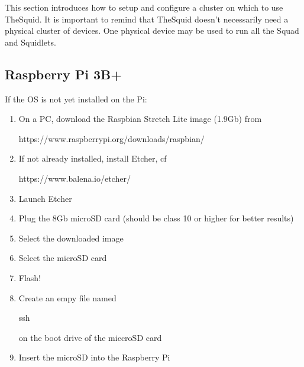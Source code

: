 This section introduces how to setup and configure a cluster on which to use TheSquid. It is important to remind that TheSquid doesn't necessarily need a physical cluster of devices. One physical device may be used to run all the Squad and Squidlets.\\

\subsection{Raspberry Pi 3B+}

If the OS is not yet installed on the Pi: 
\begin{enumerate}
\item On a PC, download the Raspbian Stretch Lite image (1.9Gb) from \begin{ttfamily}https://www.raspberrypi.org/downloads/raspbian/\end{ttfamily}
\item If not already installed, install Etcher, cf \begin{ttfamily}https://www.balena.io/etcher/\end{ttfamily}
\item Launch Etcher
\item Plug the 8Gb microSD card (should be class 10 or higher for better results)
\item Select the downloaded image
\item Select the microSD card
\item Flash!
\item Create an empy file named \begin{ttfamily}ssh\end{ttfamily} on the boot drive of the miccroSD card
\item Insert the microSD into the Raspberry Pi
\end{enumerate}

